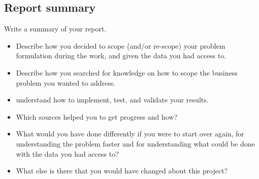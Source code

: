 \subsection{Report summary }
Write a summary of your report.
\begin{itemize}
    \item Describe how you decided to scope (and/or re-scope) your problem formulation during the work, and given the data you had access to.
    \item Describe how you searched for knowledge on how to scope the business problem you wanted to address. 
    \item understand how to implement, test, and validate your results. 
    \item Which sources helped you to get progress and how?
    \item What would you have done differently if you were to start over again, for understanding the problem faster and for understanding what could be done with the data you had access to?
    \item What else is there that you would have changed about this project?
\end{itemize}

